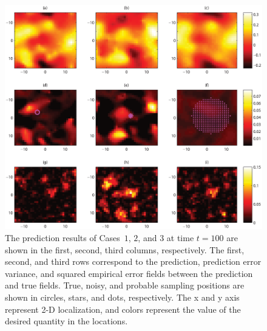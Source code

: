 \documentclass[letterpaper, 10 pt, conference]{ieeeconf}
\begin{document}
\begin{figure}
\centering
\includegraphics[trim = 30mm 20mm 2mm 2mm, width=2 \columnwidth]{firstresult.eps}%
\caption{The prediction results of Cases~$1$, $2$, and $3$ at time $t=100$ are shown in the first, second, third columns, respectively. The first, second, and third rows correspond to the prediction, prediction error variance, and squared empirical error fields between the prediction and true fields. 
True, noisy, and probable sampling positions are shown in circles, stars, and dots, respectively. The x and y axis represent 2-D localization, and colors represent the value of the desired quantity in the locations.}
\label{fig:comparelocalization}%
\end{figure}
\end{document}

